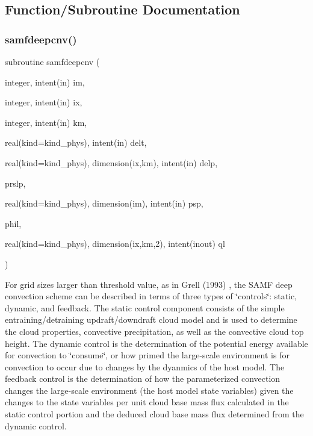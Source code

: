 \subsection{Function/\+Subroutine Documentation}
\mbox{\label{group___s_a_m_f_ga244f59e0ba7be1c351a58ddda611173e}} 
\subsubsection{\texorpdfstring{samfdeepcnv()}{samfdeepcnv()}}
{\footnotesize\ttfamily subroutine samfdeepcnv (\begin{DoxyParamCaption}\item[{integer, intent(in)}]{im,  }\item[{integer, intent(in)}]{ix,  }\item[{integer, intent(in)}]{km,  }\item[{real(kind=kind\+\_\+phys), intent(in)}]{delt,  }\item[{real(kind=kind\+\_\+phys), dimension(ix,km), intent(in)}]{delp,  }\item[{}]{prslp,  }\item[{real(kind=kind\+\_\+phys), dimension(im), intent(in)}]{psp,  }\item[{}]{phil,  }\item[{real(kind=kind\+\_\+phys), dimension(ix,km,2), intent(inout)}]{ql }\end{DoxyParamCaption})}

For grid sizes larger than threshold value, as in Grell (1993) \cite{grell_1993} , the S\+A\+MF deep convection scheme can be described in terms of three types of \char`\"{}controls\char`\"{}\+: static, dynamic, and feedback. The static control component consists of the simple entraining/detraining updraft/downdraft cloud model and is used to determine the cloud properties, convective precipitation, as well as the convective cloud top height. The dynamic control is the determination of the potential energy available for convection to \char`\"{}consume\char`\"{}, or how primed the large-\/scale environment is for convection to occur due to changes by the dyanmics of the host model. The feedback control is the determination of how the parameterized convection changes the large-\/scale environment (the host model state variables) given the changes to the state variables per unit cloud base mass flux calculated in the static control portion and the deduced cloud base mass flux determined from the dynamic control.

